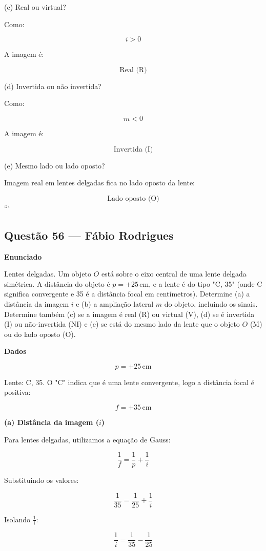 \documentclass[12pt,a4paper]{article}
\begin{document}
(c) Real ou virtual?

Como:

\[
i > 0
\]

A imagem é:

\[
\boxed{\text{Real (R)}}
\]

(d) Invertida ou não invertida?

Como:

\[
m < 0
\]

A imagem é:

\[
\boxed{\text{Invertida (I)}}
\]

(e) Mesmo lado ou lado oposto?

Imagem real em lentes delgadas fica no lado oposto da lente:

\[
\boxed{\text{Lado oposto (O)}}
\]
```


\subsection{Questão 56 — Fábio Rodrigues}
\textbf{Enunciado}

Lentes delgadas. Um objeto \(O\) está sobre o eixo central de uma lente delgada simétrica. A distância do objeto é \(p = +25\,\text{cm}\), e a lente é do tipo "C, 35" (onde C significa convergente e 35 é a distância focal em centímetros). Determine (a) a distância da imagem \(i\) e (b) a ampliação lateral \(m\) do objeto, incluindo os sinais. Determine também (c) se a imagem é real (R) ou virtual (V), (d) se é invertida (I) ou não-invertida (NI) e (e) se está do mesmo lado da lente que o objeto \(O\) (M) ou do lado oposto (O).

\vspace{0.5cm}

\textbf{Dados}

\[
p = +25\,\text{cm}
\]

Lente: C, 35. O "C" indica que é uma lente convergente, logo a distância focal é positiva:

\[
f = +35\,\text{cm}
\]

\textbf{(a) Distância da imagem (\(i\))}

Para lentes delgadas, utilizamos a equação de Gauss:

\[
\frac{1}{f} = \frac{1}{p} + \frac{1}{i}
\]

Substituindo os valores:

\[
\frac{1}{35} = \frac{1}{25} + \frac{1}{i}
\]

Isolando \(\frac{1}{i}\):

\[
\frac{1}{i} = \frac{1}{35} - \frac{1}{25}
\]
\end{document}
